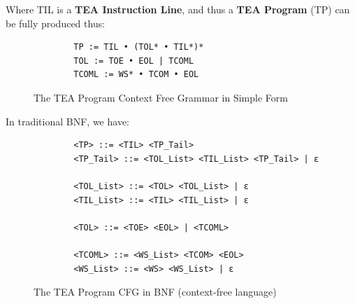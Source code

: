 \documentclass[a4paper, 18pt]{book} %
\begin{document}
Where TIL is a \textbf{TEA Instruction Line}, and thus a \textbf{TEA Program} (TP) can be fully produced thus:


   \begin{figure}[H]
  \centering
  \begin{tcolorbox}[myterminalstyle, title=TEA Program (Simple Grammar)]
  \begin{verbatim}
	    TP := TIL • (TOL* • TIL*)*
	    TOL := TOE • EOL | TCOML
	    TCOML := WS* • TCOM • EOL
  \end{verbatim}
  \end{tcolorbox}
  \caption{The TEA Program Context Free Grammar in Simple Form}
  \label{FIG5}
\end{figure}

In traditional BNF, we have:


   \begin{figure}[H]
  \centering
  \begin{tcolorbox}[myterminalstyle, title=TEA Program (BNF Grammar)]
  \begin{verbatim}
		<TP> ::= <TIL> <TP_Tail>
		<TP_Tail> ::= <TOL_List> <TIL_List> <TP_Tail> | ε
		
		<TOL_List> ::= <TOL> <TOL_List> | ε
		<TIL_List> ::= <TIL> <TIL_List> | ε
		
		<TOL> ::= <TOE> <EOL> | <TCOML>
		
		<TCOML> ::= <WS_List> <TCOM> <EOL>
		<WS_List> ::= <WS> <WS_List> | ε
  \end{verbatim}
  \end{tcolorbox}
  \caption{The TEA Program CFG in BNF (context-free language)}
  \label{FIG6}
\end{figure}
\end{document}
